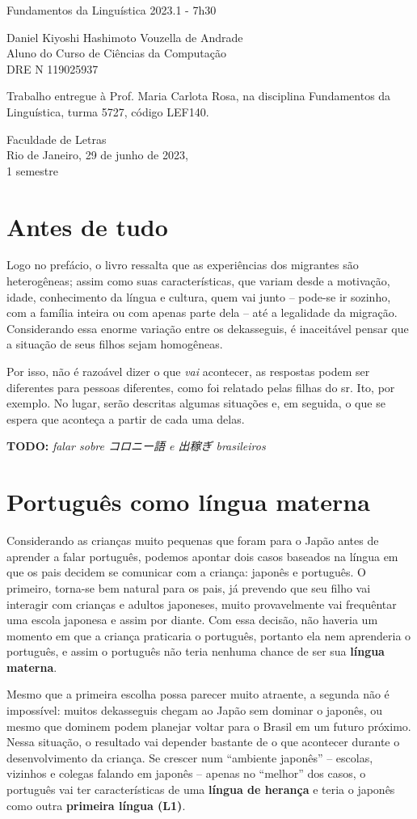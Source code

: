 \documentclass{article}
\date{}
\newcommand{\jap}[1]{#1}
\newcommand{\todo}[1]{\textbf{TODO:} \textit{#1}}
\newcommand{\keyword}[1]{\textbf{#1}}
\newcommand{\dekassegui}{\jap{出稼ぎ}}
\newcommand{\koroniago}{\jap{コロニー語}}
\newcommand{\dre}{119025937}
\newcommand{\hashi}{Daniel Kiyoshi Hashimoto Vouzella de Andrade}
\newcommand{\mytitle}{Fundamentos da Linguística 2023.1 - 7h30}
\newcommand{\myauthor}{\hashi{} \\
    Aluno do Curso de Ciências da Computação \\
    DRE N\textdegree{} \dre{}
}
\newcommand{\makecapa}{
    \newpage
    \hfill\par\vfill

    \begin{center}
        \huge
        \mytitle{}
    \end{center}

    \vfill

    \begin{center}
        \Large
        \myauthor{}
    \end{center}

    \vfill
    \vfill
    \begin{multicols}{3}
        \par\hfill \columnbreak

        \par\hfill \columnbreak

        Trabalho entregue à
        Prof. Maria Carlota Rosa,
        na disciplina
        Fundamentos da Linguística,
        turma 5727,
        código LEF140.
    \end{multicols}

    \vfill

    \begin{center}
        Faculdade de Letras \\
        Rio de Janeiro, 29 de junho de 2023, \\
        1\textdegree{} semestre
    \end{center}

    \pagenumbering{gobble}
    \newpage
    \pagenumbering{arabic}
}
\begin{document}
\makecapa

\setcounter{section}{-1}
\section{Antes de tudo}

Logo no prefácio, o livro \cite{filhosdekasegi}
ressalta que as experiências dos migrantes são heterogêneas;
assim como suas características, que variam desde
a motivação, idade, conhecimento da língua e cultura,
quem vai junto
-- pode-se ir sozinho, com a família inteira ou
com apenas parte dela --
até a legalidade da migração.
Considerando essa enorme variação entre os dekasseguis,
é inaceitável pensar que a situação de seus filhos
sejam homogêneas.

Por isso, não é razoável dizer
o que \emph{vai} acontecer,
as respostas podem ser diferentes para pessoas diferentes,
como foi relatado pelas filhas do sr. Ito, por exemplo.
No lugar, serão descritas algumas situações
e, em seguida,
o que se espera que aconteça
a partir de cada uma delas.

\todo{falar sobre \koroniago{} \cite{viagemling} e \dekassegui{} brasileiros}

\section{Português como língua materna}

Considerando as crianças muito pequenas
que foram para o Japão antes de aprender a falar português,
podemos apontar dois casos
baseados na língua em que
os pais decidem se comunicar com a criança:
japonês e português.
O primeiro, torna-se bem natural para os pais,
já prevendo que seu filho vai interagir com
crianças e adultos japoneses,
muito provavelmente vai frequêntar uma escola japonesa e
assim por diante.
Com essa decisão,
não haveria um momento em que a criança
praticaria o português,
portanto ela nem aprenderia o português,
e assim o português não teria nenhuma chance de
ser sua \keyword{língua materna}.

Mesmo que a primeira escolha possa parecer muito atraente,
a segunda não é impossível:
muitos dekasseguis chegam ao Japão sem dominar o japonês,
ou mesmo que dominem podem planejar voltar para o Brasil
em um futuro próximo.
Nessa situação, o resultado vai depender bastante
de o que acontecer durante o desenvolvimento da criança.
Se crescer num ``ambiente japonês''
-- escolas, vizinhos e colegas falando em japonês --
apenas no ``melhor'' dos casos,
o português vai ter características de uma
\keyword{língua de herança} e
teria o japonês como outra \keyword{primeira língua (L1)}.
\end{document}
